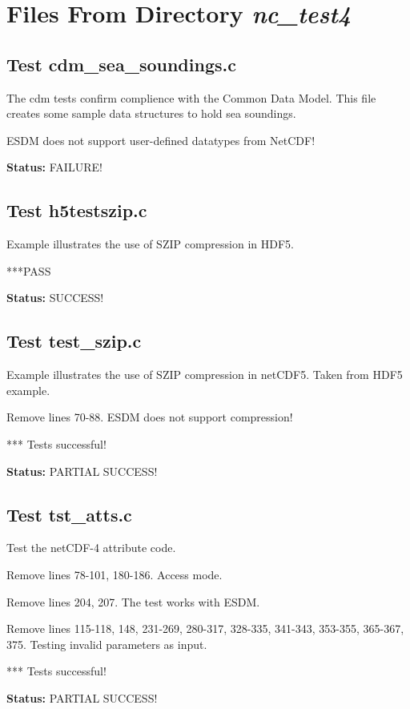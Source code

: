 \chapter{Files From Directory {\textit{nc\_test4}}}

\section{Test cdm\_sea\_soundings.c}

The cdm tests confirm complience with the Common Data Model. This
file creates some sample data structures to hold sea soundings.

ESDM does not support user-defined datatypes from NetCDF!

{\bf \large Status: } FAILURE!

\section{Test h5testszip.c}

Example illustrates the use of SZIP compression in HDF5.

***PASS

{\bf \large Status: } SUCCESS!

\section{Test test\_szip.c}

Example illustrates the use of SZIP compression in netCDF5.
Taken from HDF5 example.

Remove lines 70-88. ESDM does not support compression!

*** Tests successful!

{\bf \large Status: } PARTIAL SUCCESS!

\section{Test tst\_atts.c}

Test the netCDF-4 attribute code.

Remove lines 78-101, 180-186. Access mode.

Remove lines 204, 207. The test works with ESDM.

Remove lines 115-118, 148, 231-269, 280-317, 328-335, 341-343, 353-355, 365-367, 375. Testing invalid parameters as input.

*** Tests successful!

{\bf \large Status: } PARTIAL SUCCESS!

